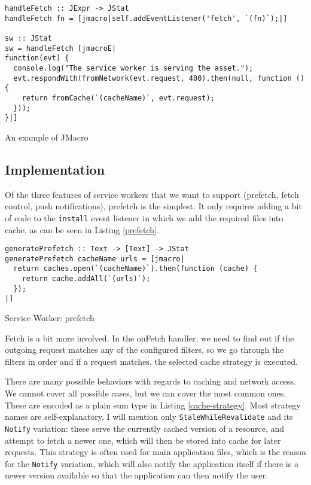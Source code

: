 \documentclass[english,odsaz]{fitthesis}
\begin{document}
\begin{listing}[htbp]
\begin{verbatim}
handleFetch :: JExpr -> JStat
handleFetch fn = [jmacro|self.addEventListener('fetch', `(fn)`);|]

sw :: JStat
sw = handleFetch [jmacroE|
function(evt) {
  console.log("The service worker is serving the asset.");
  evt.respondWith(fromNetwork(evt.request, 400).then(null, function () {
    return fromCache(`(cacheName)`, evt.request);
  }));
}|]
\end{verbatim}
\caption{An example of JMacro \label{jmacro}}
\end{listing}

\subsection{Implementation}
\label{sec:org01c504c}
Of the three features of service workers that we want to support (prefetch,
fetch control, push notifications), prefetch is the simplest. It only requires
adding a bit of code to the \texttt{install} event listener in which we add the required
files into cache, as can be seen in Listing \ref{prefetch}.

\begin{listing}[htbp]
\begin{verbatim}
generatePrefetch :: Text -> [Text] -> JStat
generatePrefetch cacheName urls = [jmacro|
  return caches.open(`(cacheName)`).then(function (cache) {
    return cache.addAll(`(urls)`);
  });
|]
\end{verbatim}
\caption{Service Worker: prefetch \label{prefetch}}
\end{listing}

Fetch is a bit more involved. In the onFetch handler, we need to find out if the
outgoing request matches any of the configured filters, so we go through the
filters in order and if a request matches, the selected cache strategy is
executed.

There are many possible behaviors with regards to caching and network access. We
cannot cover all possible cases, but we can cover the most common ones. These
are encoded as a plain sum type in Listing \ref{cache-strategy}. Most strategy names are
self-explanatory, I will mention only \texttt{StaleWhileRevalidate} and its \texttt{Notify}
variation: these serve the currently cached version of a resource, and attempt
to fetch a newer one, which will then be stored into cache for later
requests. This strategy is often used for main application files, which is the
reason for the \texttt{Notify} variation, which will also notify the application itself
if there is a newer version available so that the application can then notify
the user.
\end{document}
